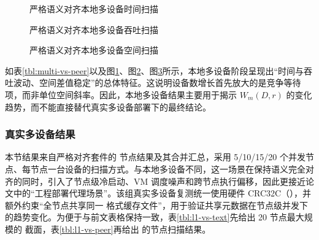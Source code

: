 \begin{figure}[H]
\centering

\caption{严格语义对齐本地多设备时间扫描}
\label{fig:multi-time-scan}
\end{figure}
\begin{figure}[H]
\centering

\caption{严格语义对齐本地多设备吞吐扫描}
\label{fig:multi-throughput-scan}
\end{figure}
\begin{figure}[H]
\centering

\caption{严格语义对齐本地多设备空间扫描}
\label{fig:multi-space-scan}
\end{figure}

如表\ref{tbl:multi-vs-peer}以及图\ref{fig:multi-time-scan}、图\ref{fig:multi-throughput-scan}、图\ref{fig:multi-space-scan}所示，本地多设备阶段呈现出``时间与吞吐波动、空间差值稳定''的总体特征。这说明设备数增长首先放大的是竞争等待项，而非单位空间斜率。因此，本地多设备结果主要用于揭示 \(W_m(D,r)\) 的变化趋势，而不能直接替代真实多设备部署下的最终结论。

\subsubsection{真实多设备结果}\label{ux771fux5b9eux591aux8bbeux5907ux7ed3ux679c}

本节结果来自严格对齐套件的  节点结果及其合并汇总，采用 5/10/15/20 个并发节点、每节点一台设备的扫描方式。与本地多设备不同，这一场景在保持语义完全对齐的同时，引入了节点级冷启动、VM 调度噪声和跨节点执行偏移，因此更接近论文中的``工程部署代理场景''。该组真实多设备复测统一使用硬件 CRC32C（），并额外约束``全节点共享同一  格式缓存文件''，用于验证共享元数据在节点级并发下的趋势变化。为便于与前文表格保持一致，表\ref{tbl:l1-vs-text}先给出 20 节点最大规模的  截面，表\ref{tbl:l1-vs-peer}再给出  的节点扫描结果。

